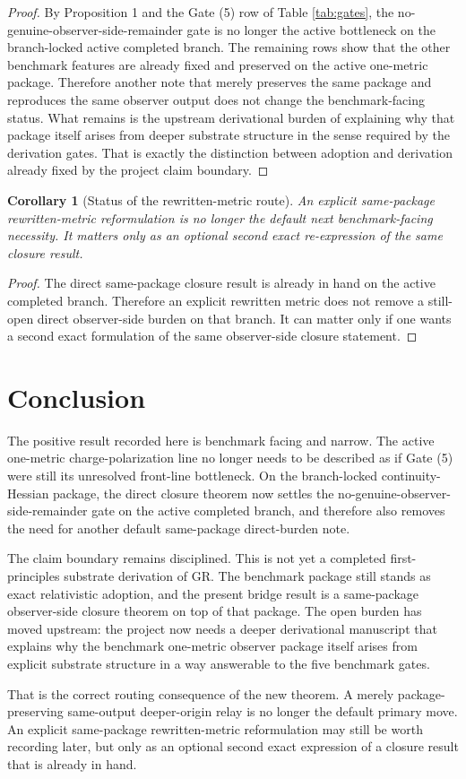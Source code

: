 \documentclass[11pt]{article}
\newtheorem{corollary}{Corollary}
\begin{document}
\begin{proof}
By Proposition 1 and the Gate (5) row of Table \ref{tab:gates}, the no-genuine-observer-side-remainder gate is no longer the active bottleneck on the branch-locked active completed branch. The remaining rows show that the other benchmark features are already fixed and preserved on the active one-metric package. Therefore another note that merely preserves the same package and reproduces the same observer output does not change the benchmark-facing status. What remains is the upstream derivational burden of explaining why that package itself arises from deeper substrate structure in the sense required by the derivation gates. That is exactly the distinction between adoption and derivation already fixed by the project claim boundary.
\end{proof}

\begin{corollary}[Status of the rewritten-metric route]
An explicit same-package rewritten-metric reformulation is no longer the default next benchmark-facing necessity. It matters only as an optional second exact re-expression of the same closure result.
\end{corollary}

\begin{proof}
The direct same-package closure result is already in hand on the active completed branch. Therefore an explicit rewritten metric does not remove a still-open direct observer-side burden on that branch. It can matter only if one wants a second exact formulation of the same observer-side closure statement.
\end{proof}

\section{Conclusion}

The positive result recorded here is benchmark facing and narrow. The active one-metric charge-polarization line no longer needs to be described as if Gate (5) were still its unresolved front-line bottleneck. On the branch-locked continuity-Hessian package, the direct closure theorem now settles the no-genuine-observer-side-remainder gate on the active completed branch, and therefore also removes the need for another default same-package direct-burden note.

The claim boundary remains disciplined. This is not yet a completed first-principles substrate derivation of GR. The benchmark package still stands as exact relativistic adoption, and the present bridge result is a same-package observer-side closure theorem on top of that package. The open burden has moved upstream: the project now needs a deeper derivational manuscript that explains why the benchmark one-metric observer package itself arises from explicit substrate structure in a way answerable to the five benchmark gates.

That is the correct routing consequence of the new theorem. A merely package-preserving same-output deeper-origin relay is no longer the default primary move. An explicit same-package rewritten-metric reformulation may still be worth recording later, but only as an optional second exact expression of a closure result that is already in hand.
\end{document}
